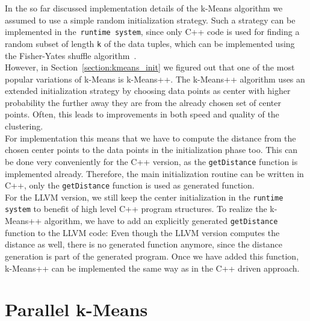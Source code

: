 In the so far discussed implementation details of the k-Means algorithm we assumed to use a simple random initialization strategy. Such a strategy can be implemented in the~\texttt{runtime system}, since only C++ code is used for finding a random subset of length \texttt{k} of the data tuples, which can be implemented using the Fisher-Yates shuffle algorithm~\parencite{fisheryates}. 
\\
However, in Section~\ref{section:kmeans_init} we figured out that one of the most popular variations of k-Means is k-Means++. The k-Means++ algorithm uses an extended initialization strategy by choosing data points as center with higher probability the further away they are from the already chosen set of center points. Often, this leads to improvements in both speed and quality of the clustering.
\\
For implementation this means that we have to compute the distance from the chosen center points to the data points in the initialization phase too. This can be done very conveniently for the C++ version, as the \texttt{getDistance} function is implemented already. Therefore, the main initialization routine can be written in C++, only the \texttt{getDistance} function is used as generated function.
\\
For the LLVM version, we still keep the center initialization in the \texttt{runtime system} to benefit of high level C++ program structures. To realize the k-Means++ algorithm, we have to add an explicitly generated \texttt{getDistance} function to the LLVM code: Even though the LLVM version computes the distance as well, there is no generated function anymore, since the distance generation is part of the generated program. Once we have added this function, k-Means++ can be implemented the same way as in the C++ driven approach.

\section{Parallel k-Means}\label{section:parallel_implementation}

